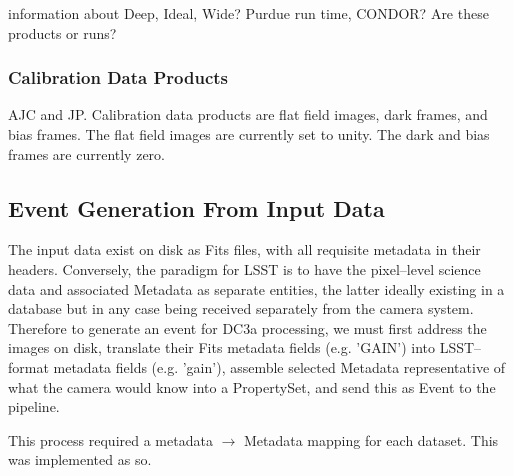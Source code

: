 information about Deep, Ideal, Wide? Purdue run time, CONDOR?
Are these products or runs?


\subsubsection{Calibration Data Products}

AJC and JP.
Calibration data products are flat field images, dark frames, and bias 
frames. The flat field images are currently set to unity. The dark 
and bias frames are currently zero.  



\subsection{Event Generation From Input Data}

The input data exist on disk as Fits files, with all requisite
metadata in their headers.  Conversely, the paradigm for LSST is to
have the pixel--level science data and associated Metadata as separate
entities, the latter ideally existing in a database but in any case
being received separately from the camera system.  Therefore to
generate an event for DC3a processing, we must first address the
images on disk, translate their Fits metadata fields (e.g. 'GAIN')
into LSST--format metadata fields (e.g. 'gain'), assemble selected Metadata
representative of what the camera would know into a PropertySet, and
send this as Event to the pipeline.

This process required a metadata $\rightarrow$ Metadata mapping for each dataset.
This was implemented as so.

